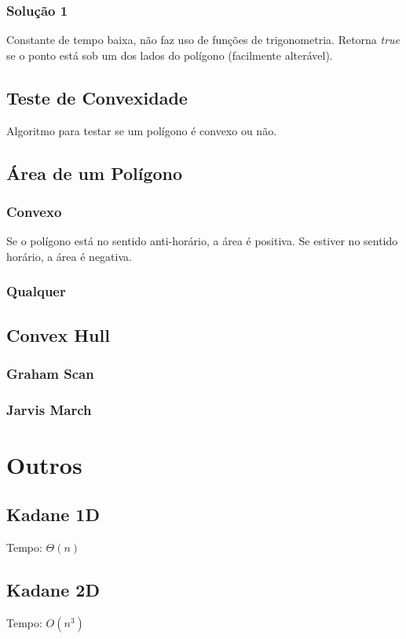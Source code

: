 \documentclass[12pt,a4paper]{article}
\begin{document}
			\subsubsection{Solução 1}
				Constante de tempo baixa, não faz uso de funções de trigonometria. Retorna \emph{true} se o ponto está sob um dos lados do polígono (facilmente alterável).
				
		\subsection{Teste de Convexidade}
			Algoritmo para testar se um polígono é convexo ou não.
		\subsection{Área de um Polígono}
			\subsubsection{Convexo}
				Se o polígono está no sentido anti-horário, a área é positiva. Se estiver no sentido horário, a área é negativa.
				
			\subsubsection{Qualquer}
				
		\subsection{Convex Hull}
			\subsubsection{Graham Scan}
				
			\subsubsection{Jarvis March}
				

	\section{Outros}
		\subsection{Kadane 1D}
			Tempo: \(\Theta(n)\)
			
		\subsection{Kadane 2D}
			Tempo: \(O(n^3)\)
\end{document}
